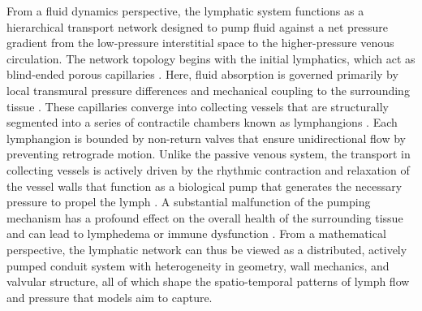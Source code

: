 \documentclass[12pt,a4paper]{article}
\begin{document}
From a fluid dynamics perspective, the lymphatic system functions as a hierarchical transport network designed to pump fluid against a net pressure gradient from the low-pressure interstitial space to the higher-pressure venous circulation. The network topology begins with the initial lymphatics, which act as blind-ended porous capillaries \cite{Null2025AnatomyLymphaticSystem}. Here, fluid absorption is governed primarily by local transmural pressure differences and mechanical coupling to the surrounding tissue \cite{mchale1976effect}. These capillaries converge into collecting vessels that are structurally segmented into a series of contractile chambers known as lymphangions \cite{wilting2022lymphatic}. Each lymphangion is bounded by non-return valves that ensure unidirectional flow by preventing retrograde motion. Unlike the passive venous system, the transport in collecting vessels is actively driven by the rhythmic contraction and relaxation of the vessel walls that function as a biological pump that generates the necessary pressure to propel the lymph \cite{munn2015mechanobiology, kunert2015mechanobiological}. A substantial malfunction of the pumping mechanism has a profound effect on the overall health of the surrounding tissue and can lead to lymphedema or immune dysfunction \cite{liao2011impaired}. From a mathematical perspective, the lymphatic network can thus be viewed as a distributed, actively pumped conduit system with heterogeneity in geometry, wall mechanics, and valvular structure, all of which shape the spatio-temporal patterns of lymph flow and pressure that models aim to capture.
\end{document}
